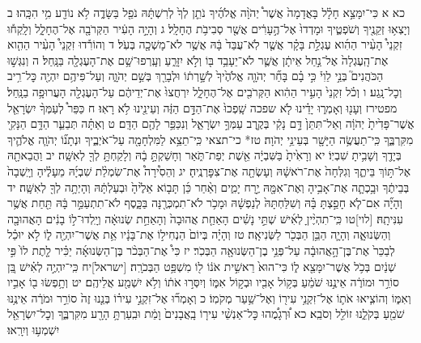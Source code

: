 \documentclass[twoside, openany, parskip=half, 11pt]{book}
\begin{document}
כא א כִּי־יִמָּצֵ֣א חָלָ֗ל בָּאֲדָמָה֙ אֲשֶׁר֩ יְהֹוָ֨ה אֱלֹהֶ֜יךָ נֹתֵ֤ן לְךָ֙ לְרִשְׁתָּ֔הּ נֹפֵ֖ל בַּשָּׂדֶ֑ה לֹ֥א נוֹדַ֖ע מִ֥י הִכָּֽהוּ׃ ב וְיָצְא֥וּ זְקֵנֶ֖יךָ וְשֹׁפְטֶ֑יךָ וּמָדְדוּ֙ אֶל־הֶ֣עָרִ֔ים אֲשֶׁ֖ר סְבִיבֹ֥ת הֶחָלָֽל׃ ג וְהָיָ֣ה הָעִ֔יר הַקְּרֹבָ֖ה אֶל־הֶחָלָ֑ל וְלָֽקְח֡וּ זִקְנֵי֩ הָעִ֨יר הַהִ֜וא עֶגְלַ֣ת בָּקָ֗ר אֲשֶׁ֤ר לֹֽא־עֻבַּד֙ בָּ֔הּ אֲשֶׁ֥ר לֹא־מָשְׁכָ֖ה בְּעֹֽל׃ ד וְהוֹרִ֡דוּ זִקְנֵי֩ הָעִ֨יר הַהִ֤וא אֶת־הָֽעֶגְלָה֙ אֶל־נַ֣חַל אֵיתָ֔ן אֲשֶׁ֛ר לֹא־יֵעָבֵ֥ד בּ֖וֹ וְלֹ֣א יִזָּרֵ֑עַ וְעָֽרְפוּ־שָׁ֥ם אֶת־הָעֶגְלָ֖ה בַּנָּֽחַל׃ ה וְנִגְּשׁ֣וּ הַכֹּהֲנִים֮ בְּנֵ֣י לֵוִי֒ כִּ֣י בָ֗ם בָּחַ֞ר יְהֹוָ֤ה אֱלֹהֶ֙יךָ֙ לְשָׁ֣רְת֔וֹ וּלְבָרֵ֖ךְ בְּשֵׁ֣ם יְהֹוָ֑ה וְעַל־פִּיהֶ֥ם יִהְיֶ֖ה כׇּל־רִ֥יב וְכׇל־נָֽגַע׃ ו וְכֹ֗ל זִקְנֵי֙ הָעִ֣יר הַהִ֔וא הַקְּרֹבִ֖ים אֶל־הֶחָלָ֑ל יִרְחֲצוּ֙ אֶת־יְדֵיהֶ֔ם עַל־הָעֶגְלָ֖ה הָעֲרוּפָ֥ה בַנָּֽחַל׃ מפטירז וְעָנ֖וּ וְאָמְר֑וּ יָדֵ֗ינוּ לֹ֤א שפכה שָֽׁפְכוּ֙ אֶת־הַדָּ֣ם הַזֶּ֔ה וְעֵינֵ֖ינוּ לֹ֥א רָאֽוּ׃ ח כַּפֵּר֩ לְעַמְּךָ֨ יִשְׂרָאֵ֤ל אֲשֶׁר־פָּדִ֙יתָ֙ יְהֹוָ֔ה וְאַל־תִּתֵּן֙ דָּ֣ם נָקִ֔י בְּקֶ֖רֶב עַמְּךָ֣ יִשְׂרָאֵ֑ל וְנִכַּפֵּ֥ר לָהֶ֖ם הַדָּֽם׃ ט וְאַתָּ֗ה תְּבַעֵ֛ר הַדָּ֥ם הַנָּקִ֖י מִקִּרְבֶּ֑ךָ כִּֽי־תַעֲשֶׂ֥ה הַיָּשָׁ֖ר בְּעֵינֵ֥י יְהֹוָה׃
טז* כי־תצאי כִּֽי־תֵצֵ֥א לַמִּלְחָמָ֖ה עַל־אֹיְבֶ֑יךָ וּנְתָנ֞וֹ יְהֹוָ֧ה אֱלֹהֶ֛יךָ בְּיָדֶ֖ךָ וְשָׁבִ֥יתָ שִׁבְיֽוֹ׃ יא וְרָאִ֙יתָ֙ בַּשִּׁבְיָ֔ה אֵ֖שֶׁת יְפַת־תֹּ֑אַר וְחָשַׁקְתָּ֣ בָ֔הּ וְלָקַחְתָּ֥ לְךָ֖ לְאִשָּֽׁה׃ יב וַהֲבֵאתָ֖הּ אֶל־תּ֣וֹךְ בֵּיתֶ֑ךָ וְגִלְּחָה֙ אֶת־רֹאשָׁ֔הּ וְעָשְׂתָ֖ה אֶת־צִפׇּרְנֶֽיהָ׃ יג וְהֵסִ֩ירָה֩ אֶת־שִׂמְלַ֨ת שִׁבְיָ֜הּ מֵעָלֶ֗יהָ וְיָֽשְׁבָה֙ בְּבֵיתֶ֔ךָ וּבָ֥כְתָ֛ה אֶת־אָבִ֥יהָ וְאֶת־אִמָּ֖הּ יֶ֣רַח יָמִ֑ים וְאַ֨חַר כֵּ֜ן תָּב֤וֹא אֵלֶ֙יהָ֙ וּבְעַלְתָּ֔הּ וְהָיְתָ֥ה לְךָ֖ לְאִשָּֽׁה׃ יד וְהָיָ֞ה אִם־לֹ֧א חָפַ֣צְתָּ בָּ֗הּ וְשִׁלַּחְתָּהּ֙ לְנַפְשָׁ֔הּ וּמָכֹ֥ר לֹא־תִמְכְּרֶ֖נָּה בַּכָּ֑סֶף לֹא־תִתְעַמֵּ֣ר בָּ֔הּ תַּ֖חַת אֲשֶׁ֥ר עִנִּיתָֽהּ׃
[לוי]טו כִּֽי־תִהְיֶ֨יןָ לְאִ֜ישׁ שְׁתֵּ֣י נָשִׁ֗ים הָאַחַ֤ת אֲהוּבָה֙ וְהָאַחַ֣ת שְׂנוּאָ֔ה וְיָֽלְדוּ־ל֣וֹ בָנִ֔ים הָאֲהוּבָ֖ה וְהַשְּׂנוּאָ֑ה וְהָיָ֛ה הַבֵּ֥ן הַבְּכֹ֖ר לַשְּׂנִיאָֽה׃ טז וְהָיָ֗ה בְּיוֹם֙ הַנְחִיל֣וֹ אֶת־בָּנָ֔יו אֵ֥ת אֲשֶׁר־יִהְיֶ֖ה ל֑וֹ לֹ֣א יוּכַ֗ל לְבַכֵּר֙ אֶת־בֶּן־הָ֣אֲהוּבָ֔ה עַל־פְּנֵ֥י בֶן־הַשְּׂנוּאָ֖ה הַבְּכֹֽר׃ יז כִּי֩ אֶת־הַבְּכֹ֨ר בֶּן־הַשְּׂנוּאָ֜ה יַכִּ֗יר לָ֤תֶת לוֹ֙ פִּ֣י שְׁנַ֔יִם בְּכֹ֥ל אֲשֶׁר־יִמָּצֵ֖א ל֑וֹ כִּי־הוּא֙ רֵאשִׁ֣ית אֹנ֔וֹ ל֖וֹ מִשְׁפַּ֥ט הַבְּכֹרָֽה׃
[ישראל]יח כִּֽי־יִהְיֶ֣ה לְאִ֗ישׁ בֵּ֚ן סוֹרֵ֣ר וּמוֹרֶ֔ה אֵינֶ֣נּוּ שֹׁמֵ֔עַ בְּק֥וֹל אָבִ֖יו וּבְק֣וֹל אִמּ֑וֹ וְיִסְּר֣וּ אֹת֔וֹ וְלֹ֥א יִשְׁמַ֖ע אֲלֵיהֶֽם׃ יט וְתָ֥פְשׂוּ ב֖וֹ אָבִ֣יו וְאִמּ֑וֹ וְהוֹצִ֧יאוּ אֹת֛וֹ אֶל־זִקְנֵ֥י עִיר֖וֹ וְאֶל־שַׁ֥עַר מְקֹמֽוֹ׃ כ וְאָמְר֞וּ אֶל־זִקְנֵ֣י עִיר֗וֹ בְּנֵ֤נוּ זֶה֙ סוֹרֵ֣ר וּמֹרֶ֔ה אֵינֶ֥נּוּ שֹׁמֵ֖עַ בְּקֹלֵ֑נוּ זוֹלֵ֖ל וְסֹבֵֽא׃ כא וּ֠רְגָמֻ֠הוּ כׇּל־אַנְשֵׁ֨י עִיר֤וֹ בָֽאֲבָנִים֙ וָמֵ֔ת וּבִֽעַרְתָּ֥ הָרָ֖ע מִקִּרְבֶּ֑ךָ וְכׇל־יִשְׂרָאֵ֖ל יִשְׁמְע֥וּ וְיִרָֽאוּ׃
\end{document}
